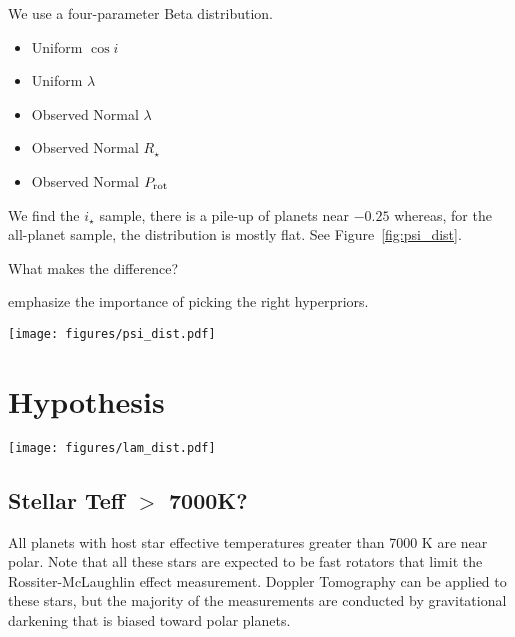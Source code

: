 \documentclass[twocolumn]{aastex631}
\begin{document}
We use a four-parameter Beta distribution.

\begin{itemize}
    \item Uniform $\cos{i}$
    \item Uniform $\lambda$
    \item Observed Normal $\lambda$
    \item Observed Normal $R_\star$
    \item Observed Normal $P_{\rm rot}$
\end{itemize}

We find the $i_\star$ sample, there is a pile-up of planets near $-0.25$ whereas, for the all-planet sample, the distribution is mostly flat. See Figure~\ref{fig:psi_dist}.

What makes the difference?

\cite{Nagpal22} emphasize the importance of picking the right hyperpriors.

\begin{figure*}[ht!]
    \begin{centering}
        \texttt{[image: figures/psi\_dist.pdf]}
        \caption{$\cos{\psi}$ distributions.}
        \label{fig:psi_dist}
    \end{centering}
\end{figure*}

\section{Hypothesis} \label{sec:tests}

\begin{figure*}[ht!]
    \begin{centering}
        \texttt{[image: figures/lam\_dist.pdf]}
        \caption{$\lambda$ distributions.}
        \label{fig:lam_dist}
    \end{centering}
\end{figure*}


\subsection{Stellar Teff $>$ 7000K?}
All planets with host star effective temperatures greater than 7000 K are near polar.
Note that all these stars are expected to be fast rotators that limit the Rossiter-McLaughlin effect measurement. Doppler Tomography can be applied to these stars, but the majority of the measurements are conducted by gravitational darkening that is biased toward polar planets.
\end{document}
